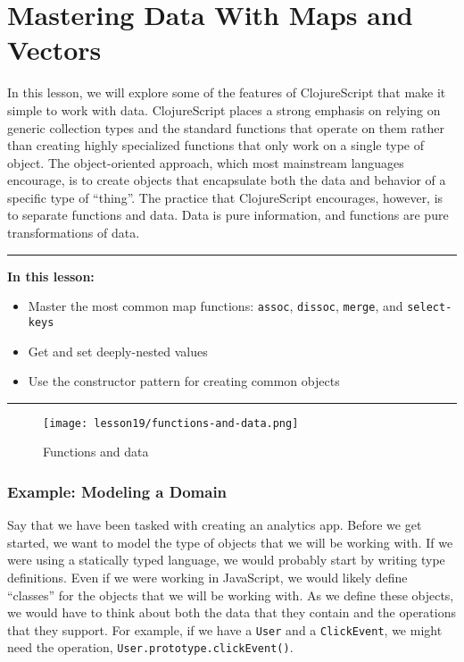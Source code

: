 \documentclass[10pt,twoside,openright]{memoir}
\begin{document}
\chapter{Mastering Data With Maps and Vectors}

In this lesson, we will explore some of the features of ClojureScript
that make it simple to work with data. ClojureScript places a strong
emphasis on relying on generic collection types and the standard
functions that operate on them rather than creating highly specialized
functions that only work on a single type of object. The object-oriented
approach, which most mainstream languages encourage, is to create
objects that encapsulate both the data and behavior of a specific type
of ``thing''. The practice that ClojureScript encourages, however, is to
separate functions and data. Data is pure information, and functions are
pure transformations of data.

\begin{center}\rule{0.5\linewidth}{0.5pt}\end{center}

\textbf{In this lesson:}

\begin{itemize}
\tightlist
\item
  Master the most common map functions: \texttt{assoc}, \texttt{dissoc},
  \texttt{merge}, and \texttt{select-keys}
\item
  Get and set deeply-nested values
\item
  Use the constructor pattern for creating common objects
\end{itemize}

\begin{center}\rule{0.5\linewidth}{0.5pt}\end{center}

\begin{figure}[H]
\caption{Functions and data}
\centering
\texttt{[image: lesson19/functions-and-data.png]}
\end{figure}


\subsection{Example: Modeling a Domain}

Say that we have been tasked with creating an analytics app. Before we
get started, we want to model the type of objects that we will be
working with. If we were using a statically typed language, we would
probably start by writing type definitions. Even if we were working in
JavaScript, we would likely define ``classes'' for the objects that we
will be working with. As we define these objects, we would have to think
about both the data that they contain and the operations that they
support. For example, if we have a \texttt{User} and a
\texttt{ClickEvent}, we might need the operation,
\texttt{User.prototype.clickEvent()}.
\end{document}
